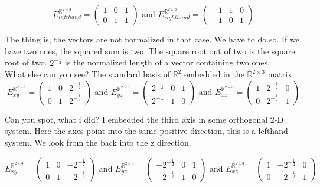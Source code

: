 \documentclass[a4paper]{article}
\begin{document}
\begin{Example}
\begin{PropositionOpt4}
\begin{displaymath}
    E^{\mathbb{R}^{2\times{3}}}_{lefthand} = \begin{pmatrix}1&0&1\\0&1&1\end{pmatrix} \mbox{ and }
    E^{\mathbb{R}^{2\times{3}}}_{righthand} = \begin{pmatrix}-1&1&0\\-1&0&1\end{pmatrix}
\end{displaymath}

The thing is, the vectors are not normalized in that case. We have to do so. If we have two ones, the squared sum is two. The square root out of two is the square root of two. $2^{-\frac12}$ is the normalized length of a vector containing two ones.\\

What else can you see? The standard basis of $\mathbb{R}^{2}$ embedded in the $\mathbb{R}^{2\times3}$ matrix.\\

\begin{displaymath}
    E^{\mathbb{R}^{2\times{3}}}_{xy} = \begin{pmatrix}1&0&2^{-\frac12}\\0&1&2^{-\frac12}\end{pmatrix} \mbox{ and }
    E^{\mathbb{R}^{2\times{3}}}_{yz} = \begin{pmatrix}2^{-\frac12}&0&1\\2^{-\frac12}&1&0\end{pmatrix} \mbox{ and }
    E^{\mathbb{R}^{2\times{3}}}_{xz} = \begin{pmatrix}1&2^{-\frac12}&0\\0&2^{-\frac12}&1\end{pmatrix} 
\end{displaymath}

Can you spot, what i did? I embedded the third axis in some orthogonal 2-D system. Here the axes point into the same positive direction, this is a lefthand system. We look from the back into the z direction.


\begin{displaymath}
    E^{\mathbb{R}^{2\times{3}}}_{xy} = \begin{pmatrix}1&0&-2^{-\frac12}\\0&1&-2^{-\frac12}\end{pmatrix} \mbox{ and }
    E^{\mathbb{R}^{2\times{3}}}_{yz} = \begin{pmatrix}-2^{-\frac12}&0&1\\-2^{-\frac12}&1&0\end{pmatrix} \mbox{ and }
    E^{\mathbb{R}^{2\times{3}}}_{xz} = \begin{pmatrix}1&-2^{-\frac12}&0\\0&-2^{-\frac12}&1\end{pmatrix} 
\end{displaymath}


\end{PropositionOpt4}
\end{Example}
\end{document}
